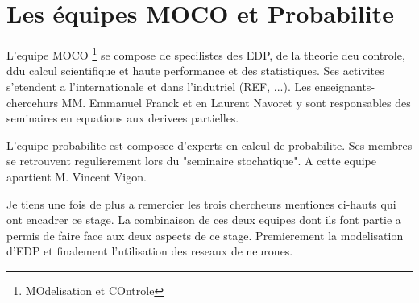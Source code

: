 \section{Les équipes MOCO et Probabilite}

L'equipe MOCO \footnote{MOdelisation et COntrole} se compose de specilistes des EDP, de la theorie deu controle, ddu calcul scientifique et haute performance et des statistiques. Ses activites s'etendent a l'internationale et dans l'indutriel (REF, ...). Les enseignants-chercehurs MM. Emmanuel Franck et en Laurent Navoret y sont responsables des seminaires en equations aux derivees partielles. 

L'equipe probabilite est composee d'experts en calcul de probabilite. Ses membres se retrouvent regulierement lors du "seminaire stochatique". A cette equipe apartient M. Vincent Vigon. 

Je tiens une fois de plus a remercier les trois chercheurs mentiones ci-hauts qui ont encadrer ce stage. La combinaison de ces deux equipes dont ils font partie a permis de faire face aux deux aspects de ce stage. Premierement la modelisation d'EDP et finalement l'utilisation des reseaux de neurones.

